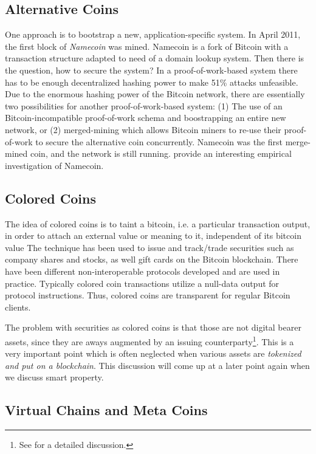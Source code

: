 \subsection{Alternative Coins}
One approach is to bootstrap a new, application-specific system. In April 2011, the first block of \emph{Namecoin} was mined. Namecoin is a fork of Bitcoin with a transaction structure adapted to need of a domain lookup system. Then there is the question, how to secure the system? In a proof-of-work-based system there has to be enough decentralized hashing power to make 51\% attacks unfeasible. Due to the enormous hashing power of the Bitcoin network, there are essentially two possibilities for another proof-of-work-based system: (1) The use of an Bitcoin-incompatible proof-of-work schema and boostrapping an entire new network, or (2) merged-mining which allows Bitcoin miners to re-use their proof-of-work to secure the alternative coin concurrently. 
Namecoin was the first merge-mined coin, and the network is still running. \cite{kalodner2015empirical} provide an interesting empirical investigation of Namecoin. 

\subsection{Colored Coins}
\label{sec:coloredcoins}

The idea of colored coins is to taint a bitcoin, i.e. a particular transaction output, in order to attach an external value or meaning to it, independent of its bitcoin value \parencite{coloredcoins} The technique has been used to issue and track/trade securities such as company shares and stocks, as well gift cards on the Bitcoin blockchain. There have been different non-interoperable protocols developed and are used in practice. Typically colored coin transactions utilize a null-data output for protocol instructions. Thus, colored coins are transparent for regular Bitcoin clients.

The problem with securities as colored coins is that those are not digital bearer assets, since they are aways augmented by an issuing counterparty\footnote{See \parencite{swanson2015} for a detailed discussion.}. This is a very important point which is often neglected when various assets are \emph{tokenized and put on a blockchain}. This discussion will come up at a later point again when we discuss smart property.

\subsection{Virtual Chains and Meta Coins}


